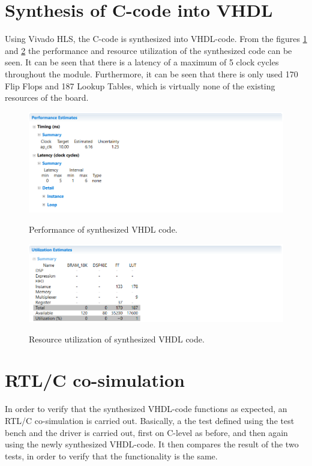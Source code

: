 \section{Synthesis of C-code into VHDL}
Using Vivado HLS, the C-code is synthesized into VHDL-code. From the figures \ref{fig:7_synth_performance} and \ref{fig:7_synth_utilization} the performance and resource utilization of the synthesized code can be seen. It can be seen that there is a latency of a maximum of 5 clock cycles throughout the module. Furthermore, it can be seen that there is only used 170 Flip Flops and 187 Lookup Tables, which is virtually none of the existing resources of the board.
\begin{figure}[b]
	\centering
	{\includegraphics[scale=0.5]{Images/7_synth_performance.png}}\\[0.5cm]
	\label{fig:7_synth_performance}
	\caption{Performance of synthesized VHDL code.}
\end{figure}
\begin{figure}[b]
	\centering
	{\includegraphics[scale=0.5]{Images/7_synth_utilization.png}}\\[0.5cm]
	\label{fig:7_synth_utilization}
	\caption{Resource utilization of synthesized VHDL code.}
\end{figure}

\FloatBarrier

\section{RTL/C co-simulation}
In order to verify that the synthesized VHDL-code functions as expected, an RTL/C co-simulation is carried out. Basically, a the test defined using the test bench and the driver is carried out, first on C-level as before, and then again using the newly synthesized VHDL-code. It then compares the result of the two tests, in order to verify that the functionality is the same.

